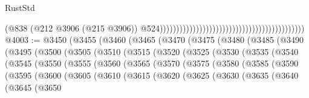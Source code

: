 \begin{lexlean}{RustStd}
\begin{coremodule}
{\begin{coremodule}
{{{{{{{{{{{{{{{{{{{{{{{{{{{{{{{{{{{{{{{{{{{{{{{{{{{{{{{                                                                                          (@838
                                                                                            (@212
                                                                                              @3906
                                                                                              (@215
                                                                                                @3906))
                                                                                            @524))))))))))))))))))))))))))))))))))))))))))))
@4003 := @3450
    (@3455
      (@3460
        (@3465
          (@3470
            (@3475
              (@3480
                (@3485
                  (@3490
                    (@3495
                      (@3500
                        (@3505
                          (@3510
                            (@3515
                              (@3520
                                (@3525
                                  (@3530
                                    (@3535
                                      (@3540
                                        (@3545
                                          (@3550
                                            (@3555
                                              (@3560
                                                (@3565
                                                  (@3570
                                                    (@3575
                                                      (@3580
                                                        (@3585
                                                          (@3590
                                                            (@3595
                                                              (@3600
                                                                (@3605
                                                                  (@3610
                                                                    (@3615
                                                                      (@3620
                                                                        (@3625
                                                                          (@3630
                                                                            (@3635
                                                                              (@3640
                                                                                (@3645
                                                                                  (@3650
}}}}}}}}}}}}}}}}}}}}}}}}}}}}}}}}}}}}}}}}}}}}}}}}}}}}}}}
\end{coremodule}}
\end{coremodule}
\end{lexlean}
